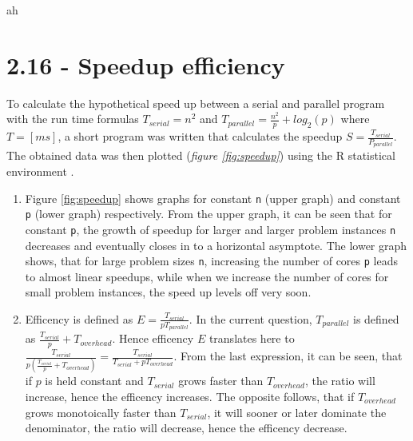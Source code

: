 \documentclass[a4paper,11pt,twoside]{article}
\begin{document}
    
ah\section{2.16 - Speedup efficiency}
To calculate the hypothetical speed up between a serial and parallel program with the run time formulas $T_{serial}=n^{2}$ and $T_{parallel} = \frac{n^{2}}{p}+log_{2}(p)$ where $T=[ms]$, a short program was written that calculates the speedup $S=\frac{T_{serial}}{P_{parallel}}$. The obtained data was then plotted (\textit{figure \ref{fig:speedup}}) using the R statistical environment \cite{rlanguage}.

\begin{enumerate}[label={\alph*)}]
\item Figure \ref{fig:speedup} shows graphs for constant \verb+n+ (upper graph) and constant \verb+p+ (lower graph) respectively. From the upper graph, it can be seen that for constant \verb+p+, the growth of speedup for larger and larger problem instances \verb+n+ decreases and eventually closes in to a horizontal asymptote. The lower graph shows, that for large problem sizes \verb+n+, increasing the number of cores \verb+p+ leads to almost linear speedups, while when we increase the number of cores for small problem instances, the speed up levels off very soon.    

\item Efficency is defined as $E = \frac{T_{serial}}{pT_{parallel}}$. In the current question, $T_{parallel}$ is defined as $\frac{T_{serial}}{p}+T_{overhead}$. Hence efficency $E$ translates here to $\frac{T_{serial}}{p(\frac{T_{serial}}{p}+T_{overhead})} = \frac{T_{serial}}{T_{serial}+pT_{overhead}}$. From the last expression, it can be seen, that if $p$ is held constant and $T_{serial}$ grows faster than $T_{overhead}$, the ratio will increase, hence the efficency increases.
The opposite follows, that if $T_{overhead}$ grows monotoically faster than $T_{serial}$, it will sooner or later dominate the denominator, the ratio will decrease, hence the efficency decrease.
  
\end{enumerate}
\end{document}

